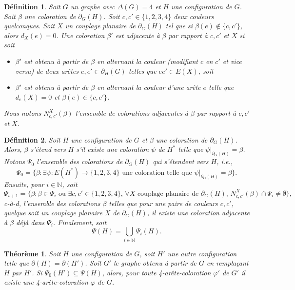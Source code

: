 \documentclass[10pt,a4paper]{article}
\newtheorem{definition}{Définition}
\newtheorem{theorem}{Théorème}
\begin{document}
\begin{definition}
Soit $G$ un graphe avec $\Delta(G)=4$ et $H$ une configuration de $G$.
Soit $\beta$ une coloration de $\partial_G(H)$. Soit $c,c'\in \{1,2,3,4\}$ deux couleurs quelconques. Soit $X$ un couplage planaire de $\partial_G(H)$ tel que si $\beta(e)\notin \{c,c'\}$, alors $d_X(e)=0$. Une coloration $\beta'$ est \emph{adjacente} à $\beta$ par rapport à $c,c'$ et $X$ si soit
\begin{itemize}
\item $\beta'$ est obtenu à partir de $\beta$ en alternant la couleur (modifiant $c$ en $c'$ et vice versa) de deux arêtes $e,e'\in \partial_H(G)$ telles que $ee'\in E(X)$, soit
\item $\beta'$ est obtenu à partir de $\beta$ en alternant la couleur d'une arête $e$ telle que $d_e(X)=0$ et $\beta(e)\in\{c,c'\}$.
\end{itemize}
Nous notons $N^X_{c,c'}(\beta)$ l'ensemble de colorations adjacentes à $\beta$ par rapport à $c,c'$ et $X$.
\end{definition}

\begin{definition}
Soit $H$ une configuration de $G$ et $\beta$ une coloration de $\partial_G(H)$. Alors, $\beta$ \emph{s'étend} vers $H$ s'il existe une coloration $\psi$ de $H^*$ telle que $\psi|_{\partial_G(H)} = \beta$. Notons $\Psi_0$ l'ensemble des colorations de $\partial_G(H)$ qui s'étendent vers $H$, i.e.,
$$
\Psi_0 = \{\beta : \exists \psi : E(H^*)\to\{1,2,3,4\} \textrm{ une coloration telle que } \psi|_{\partial_G(H)} = \beta\}.
$$
Ensuite, pour $i\in\mathbb{N}$, soit
$$
\Psi_{i+1} = 
\{ 
\beta : 
\beta\in \Psi_i
\textrm{ ou }
\exists c,c'\in \{1,2,3,4\},\, 
\forall X\textrm{ couplage planaire de $\partial_G(H)$, }
N^X_{c,c'}(\beta) \cap \Psi_i \neq \emptyset 
\},
$$
c-à-d, l'ensemble des colorations $\beta$ telles que pour une paire de couleurs $c,c'$, quelque soit un couplage planaire $X$ de $\partial_G(H)$, il existe une coloration adjacente à $\beta$ déjà dans $\Psi_{i}$. Finalement, soit
$$
\Psi(H)=\bigcup_{i\in \mathbb{N}} \Psi_i(H).
$$
\end{definition}

\begin{theorem}
Soit $H$ une configuration de $G$, soit $H'$ une autre configuration telle que $\partial(H)=\partial(H')$. Soit $G'$ le graphe obtenu à partir de $G$ en remplaçant $H$ par $H'$.
Si $\Psi_0(H')\subseteq \Psi(H)$, alors, pour toute 4-arête-coloration $\varphi'$ de $G'$ il existe une 4-arête-coloration $\varphi$ de $G$.
\label{th:red}
\end{theorem}
\end{document}
